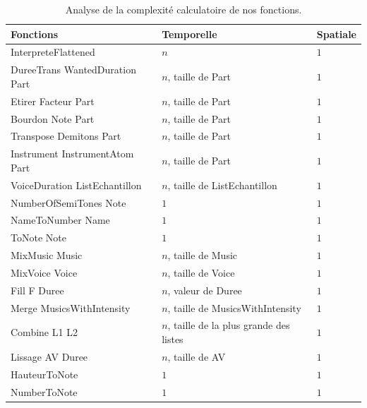 \documentclass[10pt,a4paper]{article}
\begin{document}
	\begin{table}[ht!]
		\centering
			\begin{tabular}{|p{}|p{0.25\textwidth}|p{}|}
			\hline
			\textbf{Fonctions}																& \textbf{Temporelle}							& \textbf{Spatiale}	\\
			\hline
			InterpreteFlattened																& $n$ 														& $1$ \\
			\hline
			DureeTrans WantedDuration Part 										& $n$, taille de Part							& $1$ \\
			\hline 
			Etirer Facteur Part																& $n$, taille de Part 						& $1$ \\
			\hline
			Bourdon Note Part																	& $n$, taille de Part 						& $1$ \\
			\hline
			Transpose Demitons Part														& $n$, taille de Part 						& $1$ \\
			\hline
			Instrument InstrumentAtom Part										& $n$, taille de Part							& $1$ \\
			\hline
			VoiceDuration ListEchantillon											& $n$, taille de ListEchantillon	& $1$ \\
			\hline
			NumberOfSemiTones Note														& $1$ 														& $1$ \\
			\hline
			NameToNumber Name																	& $1$ 														& $1$ \\
			\hline
			ToNote Note																				& $1$ 														& $1$ \\ 
			\hline
			\hline
			MixMusic Music																		& $n$, taille de Music						& $1$ \\
			\hline
			MixVoice Voice																		& $n$, taille de Voice						& $1$ \\
			\hline
			Fill F Duree																			& $n$, valeur de Duree						& $1$ \\
			\hline
			Merge MusicsWithIntensity													& $n$, taille de MusicsWithIntensity	& $1$ \\
			\hline
			Combine L1 L2																			& $n$, taille de la plus grande des listes	& $1$ \\
			\hline
			Lissage AV Duree																	& $n$, taille de AV								& $1$ \\
			\hline
			HauteurToNote																			& $1$ 														& $1$ \\
			\hline
			NumberToNote																			& $1$ 														& $1$ \\
			\hline
			\end{tabular}
		\caption{Analyse de la complexité calculatoire de nos fonctions.}
	\end{table}
\end{document}

